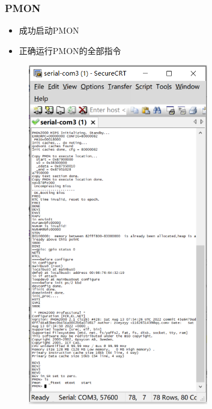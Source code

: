\documentclass{beamer}
\begin{document}
\begin{frame}
    \frametitle{PMON}

    \begin{minipage}[c]{0.4\linewidth}
        \begin{itemize}
        \item 成功启动PMON
        \item 正确运行PMON的全部指令
        \end{itemize}
    \end{minipage}
    \hfill
    \begin{minipage}{0.5\linewidth}
        \begin{figure}
            \centering
            \includegraphics[width=0.7\textwidth]{pic/PMON.png}
        \end{figure}
    \end{minipage}

\end{frame}
\end{document}
